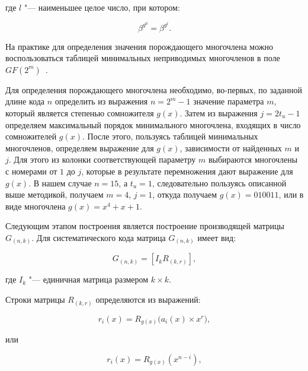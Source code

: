 \begin{ESKDexplanation}
\item[где ] $l$ "--- наименьшее целое число, при котором:
\end{ESKDexplanation}

\begin{equation*}
  \beta^{g^0} = \beta^{g^l}.
\end{equation*}

На практике для определения значения порождающего многочлена можно
воспользоваться таблицей минимальных неприводимых многочленов в поле
$GF(2^m)$~\cite{Kuznetsov}.

Для определения порождающего многочлена необходимо, во-первых, по
заданной длине кода $n$ определить из выражения $n = 2^m - 1$ значение
параметра $m$, который является степенью сомножителя $g(x)$. Затем из
выражения $j = 2t_u - 1$ определяем максимальный порядок
минимального многочлена, входящих в число сомножителей $g(x)$. После
этого, пользуясь таблицей минимальных многочленов, определяем
выражение для $g(x)$, зависимости от найденных $m$ и $j$. Для этого из
колонки соответствующей параметру $m$ выбираются многочлены с номерами
от $1$ до $j$, которые в результате перемножения дают выражение для
$g(x)$. В нашем случае $n = 15$, а $t_u = 1$, следовательно
пользуясь описанной выше методикой, получаем $m = 4$, $j = 1$, откуда
получаем $g(x)=010011$, или в виде многочлена $g(x)=x^4 + x + 1$.

Следующим этапом построения является построение производящей матрицы
$G_{(n,k)}$. Для систематического кода матрица $G_{(n, k)}$ имеет вид:

\begin{equation*}
  G_{(n,k)} = \left[I_k R_{(k, r)} \right],
\end{equation*}

\begin{ESKDexplanation}
\item[где ] $I_k$ "--- единичная матрица размером $k \times k$.
\end{ESKDexplanation}

Строки матрицы $R_{(k, r)}$ определяются из выражений:

\begin{equation}
\label{r_i(x)}
r_i(x) = R_{g(x)}\bigl(a_i(x) \times x^r \bigr),
\end{equation}

или

\begin{equation*}
r_i(x) = R_{g(x)}\left(x^{n-i} \right),
\end{equation*}

